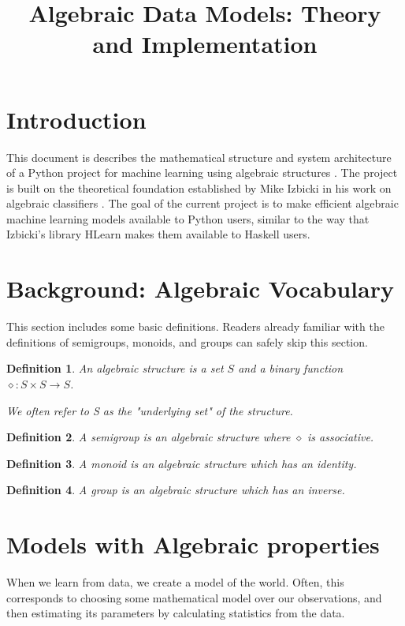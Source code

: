 \documentclass{article}
\begin{document}
\theoremstyle{mydef}
\newtheorem{mydef}{Definition}[section]
\title{Algebraic Data Models: Theory and Implementation}
\maketitle
\section{Introduction}
This document is describes the mathematical structure and system architecture of a Python project for machine learning using algebraic structures \cite{algebraic}. The project is built on the theoretical foundation established by Mike Izbicki in his work on algebraic classifiers \cite{algebraic classifiers}. The goal of the current project is to make efficient algebraic machine learning models available to Python users, similar to the way that Izbicki's library HLearn \cite{hlearn} makes them available to Haskell users.

\section{Background: Algebraic Vocabulary}
This section includes some basic definitions. Readers already familiar with the definitions of semigroups, monoids, and groups can safely skip this section.
\begin{mydef}
An algebraic structure is a set $S$ and a binary function $\diamond: S \times S \rightarrow S$.

We often refer to S as the "underlying set" of the structure.
\end{mydef}
\begin{mydef}
A semigroup is an algebraic structure where $\diamond$ is associative.
\end{mydef}
\begin{mydef}
A monoid is an algebraic structure which has an identity.
\end{mydef}
\begin{mydef}
A group is an algebraic structure which has an inverse.
\end{mydef}
\section{Models with Algebraic properties}

When we learn from data, we create a model of the world. Often, this corresponds to choosing some mathematical model over our observations, and then estimating its parameters by calculating statistics from the data. 
\end{document}
